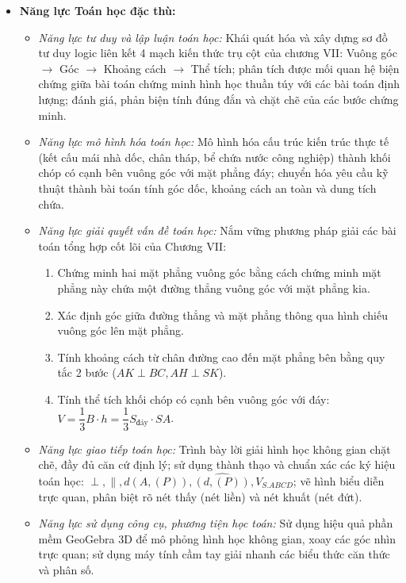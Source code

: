 \documentclass[12pt, a4paper]{article}
\begin{document}
\begin{itemize}[leftmargin=1.2cm]
    \item \textbf{Năng lực Toán học đặc thù:}
    \begin{itemize}[leftmargin=0.6cm]
        \item \textit{Năng lực tư duy và lập luận toán học:} Khái quát hóa và xây dựng sơ đồ tư duy logic liên kết 4 mạch kiến thức trụ cột của chương VII: Vuông góc $\to$ Góc $\to$ Khoảng cách $\to$ Thể tích; phân tích được mối quan hệ biện chứng giữa bài toán chứng minh hình học thuần túy với các bài toán định lượng; đánh giá, phản biện tính đúng đắn và chặt chẽ của các bước chứng minh.
        \item \textit{Năng lực mô hình hóa toán học:} Mô hình hóa cấu trúc kiến trúc thực tế (kết cấu mái nhà dốc, chân tháp, bể chứa nước công nghiệp) thành khối chóp có cạnh bên vuông góc với mặt phẳng đáy; chuyển hóa yêu cầu kỹ thuật thành bài toán tính góc dốc, khoảng cách an toàn và dung tích chứa.
        \item \textit{Năng lực giải quyết vấn đề toán học:} Nắm vững phương pháp giải các bài toán tổng hợp cốt lõi của Chương VII:
        \begin{enumerate}
            \item Chứng minh hai mặt phẳng vuông góc bằng cách chứng minh mặt phẳng này chứa một đường thẳng vuông góc với mặt phẳng kia.
            \item Xác định góc giữa đường thẳng và mặt phẳng thông qua hình chiếu vuông góc lên mặt phẳng.
            \item Tính khoảng cách từ chân đường cao đến mặt phẳng bên bằng quy tắc 2 bước ($AK \perp BC, AH \perp SK$).
            \item Tính thể tích khối chóp có cạnh bên vuông góc với đáy: $V = \dfrac{1}{3} B \cdot h = \dfrac{1}{3} S_{\text{đáy}} \cdot SA$.
        \end{enumerate}
        \item \textit{Năng lực giao tiếp toán học:} Trình bày lời giải hình học không gian chặt chẽ, đầy đủ căn cứ định lý; sử dụng thành thạo và chuẩn xác các ký hiệu toán học: $\perp, \parallel, d(A, (P)), \widehat{(d, (P))}, V_{S.ABCD}$; vẽ hình biểu diễn trực quan, phân biệt rõ nét thấy (nét liền) và nét khuất (nét đứt).
        \item \textit{Năng lực sử dụng công cụ, phương tiện học toán:} Sử dụng hiệu quả phần mềm GeoGebra 3D để mô phỏng hình học không gian, xoay các góc nhìn trực quan; sử dụng máy tính cầm tay giải nhanh các biểu thức căn thức và phân số.
    \end{itemize}


\end{itemize}
\end{document}

